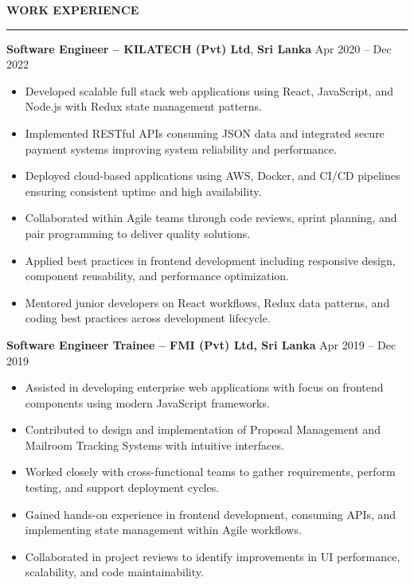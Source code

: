 \documentclass[10pt,letterpaper]{article}
\begin{document}
\vspace{8pt}

\textbf{WORK EXPERIENCE}\\[-8pt]
\noindent\rule{\textwidth}{1pt}

\vspace{-2pt}

\textbf{Software Engineer -- KILATECH (Pvt) Ltd}, \textbf{Sri Lanka} \hfill Apr 2020 -- Dec 2022

\vspace{-1pt}

\begin{itemize}
\item Developed scalable full stack web applications using React, JavaScript, and Node.js with Redux state management patterns.
\item Implemented RESTful APIs consuming JSON data and integrated secure payment systems improving system reliability and performance.
\item Deployed cloud-based applications using AWS, Docker, and CI/CD pipelines ensuring consistent uptime and high availability.
\item Collaborated within Agile teams through code reviews, sprint planning, and pair programming to deliver quality solutions.
\item Applied best practices in frontend development including responsive design, component reusability, and performance optimization.
\item Mentored junior developers on React workflows, Redux data patterns, and coding best practices across development lifecycle.
\end{itemize}

\textbf{Software Engineer Trainee -- FMI (Pvt) Ltd, Sri Lanka} \hfill Apr 2019 -- Dec 2019

\vspace{-1pt}

\begin{itemize}
\item Assisted in developing enterprise web applications with focus on frontend components using modern JavaScript frameworks.
\item Contributed to design and implementation of Proposal Management and Mailroom Tracking Systems with intuitive interfaces.
\item Worked closely with cross-functional teams to gather requirements, perform testing, and support deployment cycles.
\item Gained hands-on experience in frontend development, consuming APIs, and implementing state management within Agile workflows.
\item Collaborated in project reviews to identify improvements in UI performance, scalability, and code maintainability.
\end{itemize}
\end{document}
